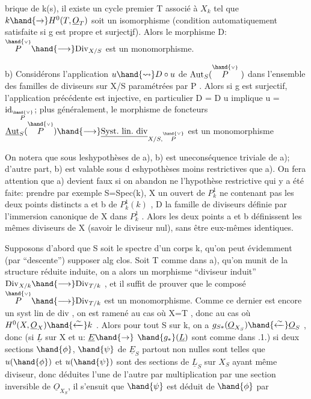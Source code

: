 brique de k(s), il existe un cycle premier T associé à $X_k$ tel que
$k \hand{\to} H^0(T,\underline{O}_T)$ soit un isomorphisme (condition automatiquement satisfaite
si g est propre et surject\uline{i}f). Alors le morphisme D: $\overset{\hand{\scriptscriptstyle\vee}}{P} \hand{\longrightarrow} \mathrm{Div}_{X/S}$ est
un monomorphisme.

b)  Considérons l'application $u \hand{\rightsquigarrow} D\circ u$ de
$\mathrm{Aut}_S(\overset{\hand{\scriptscriptstyle\vee}}{P}\ )$ dans l'ensemble des familles de diviseurs sur X/S paramétrées
par P . Alors si g est surjectif, l'application précédente est injective,
en particulier D = D u implique u = $\mathrm{id}_{\overset{\hand{\scriptscriptstyle\vee}}{P}}$; plus généralement, le morphisme de foncteurs $\underline{\mathrm{Aut}}_S(\overset{\hand{\scriptscriptstyle\vee}}{P}) \hand{\longrightarrow} \underline{\mathrm{Syst.\ lin.\ div}}_{X/S,\overset{\hand{\scriptscriptstyle\vee}}{P}}$ est un monomorphisme

On notera que sous leshypothèses de a), b) est uneconséquence
triviale de a); d'autre part, b) est valable sous d eshypothèses moins
restrictives que a). On fera attention que a) devient faux si on abandon
ne l'hypothèse restrictive qui y a  été faite: prendre par exemple
S=Spec(k), X un ouvert de $P^1_k$ ne contenant pas les deux points distincts
a et b de $P^1_k(k)$ , D la famille de diviseurs définie par l'immersion
canonique de X dans $P^1_k$ . Alors les deux  points a et b
définissent les mêmes diviseurs de X (savoir le diviseur nul), sans être
eux-mêmes identiques.

Supposons d'abord que S soit le spectre d'un corps k, qu'on peut évidemment (par ``descente'') supposer alg clos. 
Soit T comme dans a), qu'on munit de la structure réduite induite, on a alors un morphisme ``diviseur induit''
$\mathrm{Div}_{X/k} \hand{\longrightarrow} \mathrm{Div}_{T/k}$ , et il suffit de prouver que le composé $\overset{\hand{\scriptscriptstyle\vee}}{P} \hand{\longrightarrow} \mathrm{Div}_{T/k}$
est un monomorphisme. Comme ce dernier est encore un syst lin de div ,
on est ramené au cas où X=T , donc au cas où $H^0(X,\underline{O}_X) \hand{\xleftarrow{\sim}} k$ . Alors pour
tout S sur k, on a $g_{S*}(\underline{O}_{X_S}) \hand{\xleftarrow{\sim}} \underline{O}_S$ , donc (si $\underline{L}$ sur X et u: $\underline{E} \hand{\to}$ $\hand{g_*}(\underline{L})$
sont comme dans .1.) si deux sections $\hand{\phi}$, $\hand{\psi}$ de $\underline{E}_S$ partout non nulles
sont telles que $u(\hand{\phi})$ et $u(\hand{\psi})$ sont des sections de $\underline{L}_S$ sur $X_S$ ayant même
diviseur, donc  déduites l'une de l'autre par multiplication par
une section inversible de $\underline{O}_{X_S}$, il s'ensuit que $\hand{\psi}$ est déduit de $\hand{\phi}$ par 

